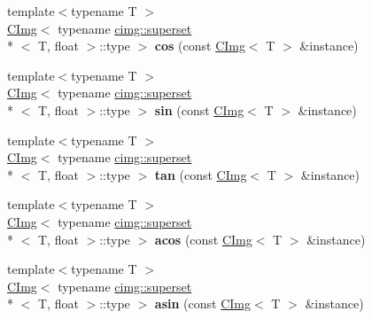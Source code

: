 \begin{DoxyCompactItemize}
\item 
\hypertarget{namespacecimg__library_a3a0f1df165d2a1301332b21ded439bc8}{{\footnotesize template$<$typename T $>$ }\\\hyperlink{structcimg__library_1_1_c_img}{C\-Img}$<$ typename \hyperlink{structcimg__library_1_1cimg_1_1superset}{cimg\-::superset}\\*
$<$ T, float $>$\-::type $>$ {\bfseries cos} (const \hyperlink{structcimg__library_1_1_c_img}{C\-Img}$<$ T $>$ \&instance)}\label{namespacecimg__library_a3a0f1df165d2a1301332b21ded439bc8}

\item 
\hypertarget{namespacecimg__library_ab002b1d2737ed26fe366aaa4d40b125a}{{\footnotesize template$<$typename T $>$ }\\\hyperlink{structcimg__library_1_1_c_img}{C\-Img}$<$ typename \hyperlink{structcimg__library_1_1cimg_1_1superset}{cimg\-::superset}\\*
$<$ T, float $>$\-::type $>$ {\bfseries sin} (const \hyperlink{structcimg__library_1_1_c_img}{C\-Img}$<$ T $>$ \&instance)}\label{namespacecimg__library_ab002b1d2737ed26fe366aaa4d40b125a}

\item 
\hypertarget{namespacecimg__library_af046cf7087da2ff166449a332ac97197}{{\footnotesize template$<$typename T $>$ }\\\hyperlink{structcimg__library_1_1_c_img}{C\-Img}$<$ typename \hyperlink{structcimg__library_1_1cimg_1_1superset}{cimg\-::superset}\\*
$<$ T, float $>$\-::type $>$ {\bfseries tan} (const \hyperlink{structcimg__library_1_1_c_img}{C\-Img}$<$ T $>$ \&instance)}\label{namespacecimg__library_af046cf7087da2ff166449a332ac97197}

\item 
\hypertarget{namespacecimg__library_ab7d40d1a8afcaa4fabed45ed333835d7}{{\footnotesize template$<$typename T $>$ }\\\hyperlink{structcimg__library_1_1_c_img}{C\-Img}$<$ typename \hyperlink{structcimg__library_1_1cimg_1_1superset}{cimg\-::superset}\\*
$<$ T, float $>$\-::type $>$ {\bfseries acos} (const \hyperlink{structcimg__library_1_1_c_img}{C\-Img}$<$ T $>$ \&instance)}\label{namespacecimg__library_ab7d40d1a8afcaa4fabed45ed333835d7}

\item 
\hypertarget{namespacecimg__library_a794f216de85b7d0176f5f91e6fefa036}{{\footnotesize template$<$typename T $>$ }\\\hyperlink{structcimg__library_1_1_c_img}{C\-Img}$<$ typename \hyperlink{structcimg__library_1_1cimg_1_1superset}{cimg\-::superset}\\*
$<$ T, float $>$\-::type $>$ {\bfseries asin} (const \hyperlink{structcimg__library_1_1_c_img}{C\-Img}$<$ T $>$ \&instance)}\label{namespacecimg__library_a794f216de85b7d0176f5f91e6fefa036}


\end{DoxyCompactItemize}
